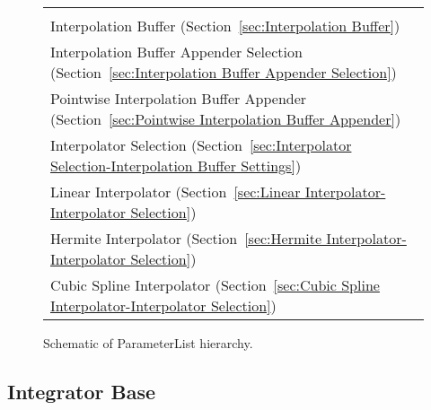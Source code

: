 \begin{figure}
\begin{tabular}{p{}}
    \index{Trailing Interpolation Buffer Selection} \\ 
\hspace*{0.6in} Interpolation Buffer (Section~\ref{sec:Interpolation Buffer})
    \index{Interpolation Buffer} \\ 
\hspace*{0.4in} Interpolation Buffer Appender Selection (Section~\ref{sec:Interpolation Buffer Appender Selection})
    \index{Interpolation Buffer Appender Selection} \\ 
\hspace*{0.6in} Pointwise Interpolation Buffer Appender (Section~\ref{sec:Pointwise Interpolation Buffer Appender})
    \index{Pointwise Interpolation Buffer Appender} \\ 
\hspace*{0.4in} Interpolator Selection (Section~\ref{sec:Interpolator Selection-Interpolation Buffer Settings})
    \index{Interpolator Selection} \\ 
\hspace*{0.6in} Linear Interpolator (Section~\ref{sec:Linear Interpolator-Interpolator Selection})
    \index{Linear Interpolator} \\ 
\hspace*{0.6in} Hermite Interpolator (Section~\ref{sec:Hermite Interpolator-Interpolator Selection})
    \index{Hermite Interpolator} \\ 
\hspace*{0.6in} Cubic Spline Interpolator (Section~\ref{sec:Cubic Spline Interpolator-Interpolator Selection})
    \index{Cubic Spline Interpolator} \\ 
  \end{tabular}
\caption{Schematic of ParameterList hierarchy.} 
\label{fig:ParameterList-schematic} 
\end{figure} 
\newpage 

\subsection{Integrator Base}
\label{sec:Integrator Base}

